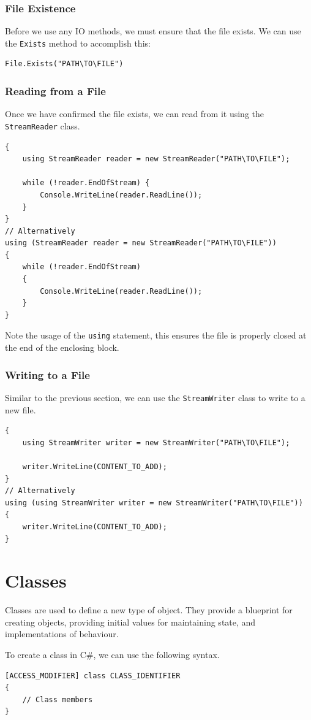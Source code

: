 \documentclass{article}
\begin{document}
\subsubsection{File Existence}
Before we use any IO methods, we must ensure that the file exists.
We can use the \lstinline{Exists} method to accomplish this:
\begin{lstlisting}[numbers=none]
File.Exists("PATH\TO\FILE")
\end{lstlisting}
\subsubsection{Reading from a File}
Once we have confirmed the file exists, we can read from it using the \lstinline{StreamReader} class.
\begin{lstlisting}[numbers=none]
{
    using StreamReader reader = new StreamReader("PATH\TO\FILE");

    while (!reader.EndOfStream) {
        Console.WriteLine(reader.ReadLine());
    }
}
// Alternatively
using (StreamReader reader = new StreamReader("PATH\TO\FILE"))
{
    while (!reader.EndOfStream)
    {
        Console.WriteLine(reader.ReadLine());
    }
}
\end{lstlisting}
Note the usage of the \lstinline{using} statement, this ensures the file is properly closed at the end
of the enclosing block.
\subsubsection{Writing to a File}
Similar to the previous section, we can use the \lstinline{StreamWriter} class to write to a new file.
\begin{lstlisting}[numbers=none]
{
    using StreamWriter writer = new StreamWriter("PATH\TO\FILE");

    writer.WriteLine(CONTENT_TO_ADD);
}
// Alternatively
using (using StreamWriter writer = new StreamWriter("PATH\TO\FILE"))
{
    writer.WriteLine(CONTENT_TO_ADD);
}
\end{lstlisting}
\section{Classes}
Classes are used to define a new type of object. They provide a blueprint for creating objects,
providing initial values for maintaining state, and implementations of behaviour.

To create a class in C\#, we can use the following syntax.
\begin{lstlisting}[numbers=none]
[ACCESS_MODIFIER] class CLASS_IDENTIFIER 
{
    // Class members
}     
\end{lstlisting}
\end{document}
